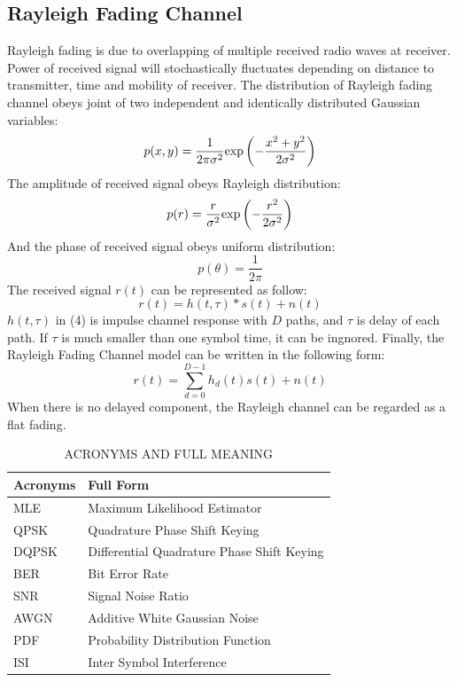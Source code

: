 \documentclass[technicalreport]{ieicej}
\begin{document}
\subsection{Rayleigh Fading Channel}
Rayleigh fading is due to overlapping of multiple received radio waves at receiver. Power of received signal will stochastically fluctuates depending on distance to transmitter, time and mobility of receiver. The distribution of Rayleigh fading channel obeys joint of two independent and identically distributed Gaussian variables\cite{wireless_com}:
\begin{equation}
p(x,y)=\frac{1}{2\pi\sigma^2}{\rm exp}\left(-\frac{x^2+y^2}{2\sigma^2}\right)
\end{equation}
The amplitude of received signal obeys Rayleigh distribution:
\begin{equation}
p(r)=\frac{r}{\sigma^2}{\rm exp}\left(-\frac{r^2}{2\sigma^2}\right)
\end{equation}
And the phase of received signal obeys uniform distribution:
\begin{equation}
p(\theta)=\frac{1}{2\pi}
\end{equation}
The received signal $r(t)$ can be represented as follow:
\begin{equation}
r(t)=h(t,\tau)*s(t)+n(t)
\end{equation}
$h(t,\tau)$ in (4) is impulse channel response with $D$ paths, and $\tau$ is delay of each path. If $\tau$ is much smaller than one symbol time, it can be ingnored. Finally, the Rayleigh Fading Channel model can be written in the following form:
\begin{equation}
r(t)=\sum_{d=0}^{D-1}h_{d}(t)s(t)+n(t)
\end{equation}
When there is no delayed component, the Rayleigh channel can be regarded as a flat fading.
\begin{table}[H]
	\begin{center}
	\caption{ACRONYMS AND FULL MEANING}
	\begin{tabular}{|l|l|}
	\hline
	\textbf{Acronyms} & \textbf{Full Form} \\
	\hline
	 MLE & Maximum Likelihood Estimator  \\ 
	 \hline
	 QPSK & Quadrature Phase Shift Keying  \\ 
	 \hline
	 DQPSK & Differential Quadrature Phase Shift Keying  \\
	 \hline
	 BER & Bit Error Rate \\
	 \hline
	 SNR & Signal Noise Ratio \\ 
	 \hline
	 AWGN & Additive White Gaussian Noise \\ 
	 \hline
	 PDF & Probability Distribution Function \\
	 \hline
	 ISI & Inter Symbol Interference \\
	 \hline
	\end{tabular}
	\end{center}
\end{table}
\end{document}
